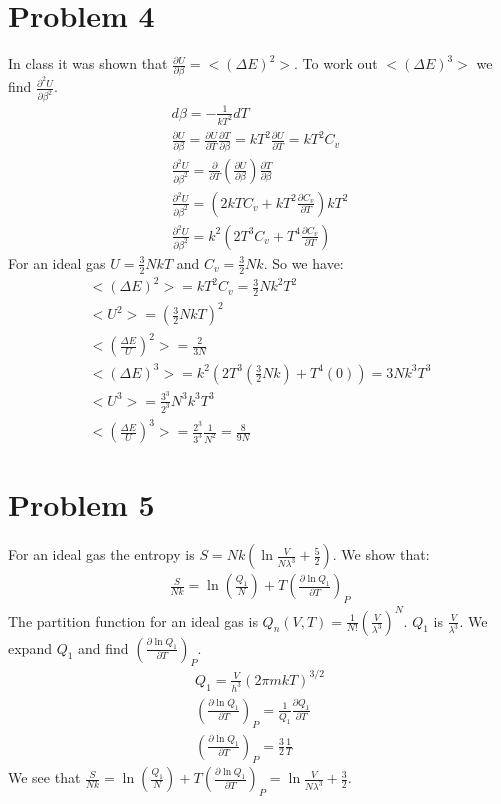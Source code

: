 \documentclass[a4paper,11pt]{article}
\numberwithin{equation}{section}
\begin{document}
\section{Problem 4}
In class it was shown that $\frac{\partial U}{\partial \beta}=<(\Delta E)^2>$. 
To work out $<(\Delta E)^3>$ we find $\frac{\partial^2 U}{\partial \beta^2}$.
\begin{gather}
 d\beta=-\frac{1}{kT^2}dT\\
 \frac{\partial U}{\partial \beta}=\frac{\partial U}{\partial T}\frac{\partial T}{\partial \beta}
  =kT^2\frac{\partial U}{\partial T}=kT^2C_v\\
 \frac{\partial^2 U}{\partial \beta^2}=\frac{\partial}{\partial T}(\frac{\partial U}{\partial \beta})\frac{\partial T}{\partial \beta} \\
 \frac{\partial^2 U}{\partial \beta^2}=\left(2kTC_v+kT^2\frac{\partial C_v}{\partial T} \right)kT^2\\
 \frac{\partial^2 U}{\partial \beta^2}=k^2\left(2T^3C_v+T^4\frac{\partial C_v}{\partial T} \right)
\end{gather}
For an ideal gas $U=\frac{3}{2}NkT$ and $C_v=\frac{3}{2}Nk$. So we have:
\begin{gather}
 <(\Delta E)^2> = kT^2C_v=\frac{3}{2}Nk^2T^2\\
 <U^2>=(\frac{3}{2}NkT)^2\\
 <(\frac{\Delta E}{U})^2>=\frac{2}{3N}\\
 <(\Delta E)^3>=k^2(2T^3(\frac{3}{2}Nk)+T^4(0))=3Nk^3T^3\\
 <U^3>=\frac{3^3}{2^3}N^3k^3T^3\\
 <(\frac{\Delta E}{U})^3>=\frac{2^3}{3^3}\frac{1}{N^2}=\frac{8}{9N}
\end{gather}

\section{Problem 5}
For an ideal gas the entropy is $S=Nk\left(\ln{\frac{V}{N\lambda ^3}}+\frac{5}{2} \right)$.
We show that:
\begin{gather}
 \frac{S}{Nk}=\ln{(\frac{Q_1}{N})}+T(\frac{\partial \ln{Q_1}}{\partial T})_P
\end{gather}
The partition function for an ideal gas is $Q_n(V,T)=\frac{1}{N!}(\frac{V}{\lambda ^3})^N$.
$Q_1$ is $\frac{V}{\lambda ^3}$. We expand $Q_1$ and find $(\frac{\partial \ln{Q_1}}{\partial T})_P$.
\begin{gather}
 Q_1=\frac{V}{h^3}(2\pi mkT)^{3/2}\\
 (\frac{\partial \ln{Q_1}}{\partial T})_P=\frac{1}{Q_1}\frac{\partial Q_1}{\partial T}\\
 (\frac{\partial \ln{Q_1}}{\partial T})_P=\frac{3}{2}\frac{1}{T}
\end{gather}
We see that $\frac{S}{Nk}=\ln{(\frac{Q_1}{N})}+T(\frac{\partial \ln{Q_1}}{\partial T})_P=\ln{\frac{V}{N\lambda ^3}+\frac{3}{2}}$.
\end{document}
